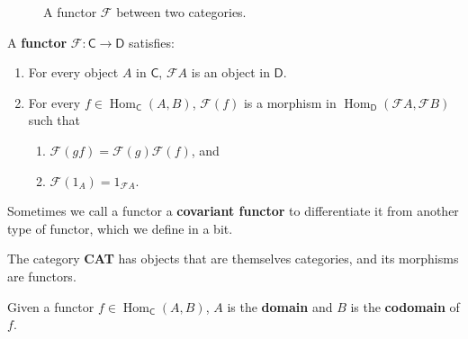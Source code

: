 \documentclass[10pt]{report}
\newcommand{\cat}[1]{\mathsf{#1}}
\DeclareMathOperator{\hh}{Hom}
\begin{document}
\begin{figure}[H]
	\centering
\caption{A functor $\mathcal{F}$ between two categories.}
\end{figure}

\begin{defn}
	A \textbf{functor} $\mathcal{F}:\cat{C}\to \cat{D}$ satisfies:
\begin{enumerate}
	\item For every object $A$ in $\cat{C}$, $\mathcal{F}A$ is an object in $\cat{D}$.
	\item For every $f \in \hh_{\cat{C}}(A,B)$, $\mathcal{F}(f)$ is a morphism in $\hh_{\cat{D}}(\mathcal{F}A, \mathcal{F}B)$ such that
		\begin{enumerate}
			\item $\mathcal{F}(gf) = \mathcal{F}(g) \mathcal{F}(f)$, and
			\item $\mathcal{F}(1_{A}) = 1_{\mathcal{F}A}$.
		\end{enumerate}
\end{enumerate}
	Sometimes we call a functor a \textbf{covariant functor} to differentiate it from another type of functor, which we define in a bit.
\end{defn}

\begin{ex}
The category \textbf{CAT} has objects that are themselves categories, and its morphisms are functors.
\end{ex}

\begin{defn}
	Given a functor $f \in \hh_{\cat{C}}(A,B)$, $A$ is the \textbf{domain} and $B$ is the \textbf{codomain} of $f$.
\end{defn}
\end{document}
